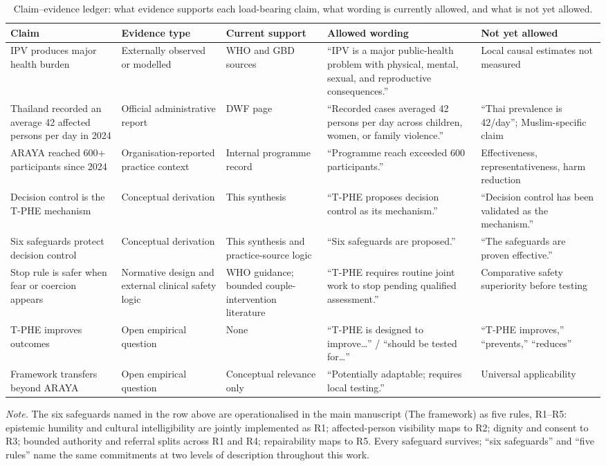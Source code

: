 \documentclass[11pt]{article}
\newcommand{\tphe}{T\mbox{-}PHE}
\begin{document}
\begin{table}[H]
\centering\footnotesize
\caption{Claim--evidence ledger: what evidence supports each load-bearing claim, what wording is currently allowed, and what is not yet allowed.}
\label{tab:S3b}
\begin{tabularx}{\textwidth}{@{}YYYYY@{}}
\toprule
\textbf{Claim} & \textbf{Evidence type} & \textbf{Current support} & \textbf{Allowed wording} & \textbf{Not yet allowed}\\
\midrule
IPV produces major health burden & Externally observed or modelled & WHO and GBD sources & ``IPV is a major public-health problem with physical, mental, sexual, and reproductive consequences.'' & Local causal estimates not measured\\
Thailand recorded an average 42 affected persons per day in 2024 & Official administrative report & DWF page & ``Recorded cases averaged 42 persons per day across children, women, or family violence.'' & ``Thai prevalence is 42/day''; Muslim-specific claim\\
ARAYA reached 600+ participants since 2024 & Organisation-reported practice context & Internal programme record & ``Programme reach exceeded 600 participants.'' & Effectiveness, representativeness, harm reduction\\
Decision control is the \tphe{} mechanism & Conceptual derivation & This synthesis & ``\tphe{} proposes decision control as its mechanism.'' & ``Decision control has been validated as the mechanism.''\\
Six safeguards protect decision control & Conceptual derivation & This synthesis and practice-source logic & ``Six safeguards are proposed.'' & ``The safeguards are proven effective.''\\
Stop rule is safer when fear or coercion appears & Normative design and external clinical safety logic & WHO guidance; bounded couple-intervention literature & ``\tphe{} requires routine joint work to stop pending qualified assessment.'' & Comparative safety superiority before testing\\
\tphe{} improves outcomes & Open empirical question & None & ``\tphe{} is designed to improve\ldots'' / ``should be tested for\ldots'' & ``\tphe{} improves,'' ``prevents,'' ``reduces''\\
Framework transfers beyond ARAYA & Open empirical question & Conceptual relevance only & ``Potentially adaptable; requires local testing.'' & Universal applicability\\
\bottomrule
\end{tabularx}
\smallskip

\noindent\footnotesize\textit{Note.} The six safeguards named in the row above are operationalised in the main manuscript (The framework) as five rules, R1--R5: epistemic humility and cultural intelligibility are jointly implemented as R1; affected-person visibility maps to R2; dignity and consent to R3; bounded authority and referral splits across R1 and R4; repairability maps to R5. Every safeguard survives; ``six safeguards'' and ``five rules'' name the same commitments at two levels of description throughout this work.
\end{table}
\end{document}
